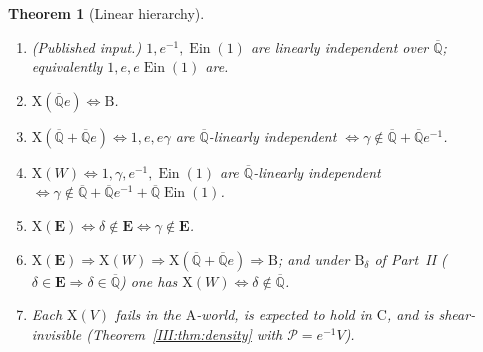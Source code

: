 \documentclass[11pt,a4paper]{article}
\newcommand{\Qbar}{\overline{\mathbb Q}}
\newcommand{\Ein}{\operatorname{Ein}}
\newcommand{\EE}{\mathbf E}
\newcommand{\Pc}{\mathcal P}
\newtheorem{theorem}{Theorem}[section]
\theoremstyle{definition}
\theoremstyle{remark}
\numberwithin{equation}{section}
\begin{document}
\begin{theorem}[Linear hierarchy]\label{III:thm:hierarchy}
\begin{enumerate}[label=(\roman*)]
\item \textup{(Published input.)} $1,e^{-1},\Ein(1)$ are linearly independent over
$\Qbar$; equivalently $1,e,e\Ein(1)$ are.
\item $\mathrm X(\Qbar e)\iff\mathrm B$.
\item $\mathrm X(\Qbar+\Qbar e)\iff 1,e,e\gamma$ are $\Qbar$-linearly independent
$\iff\gamma\notin\Qbar+\Qbar e^{-1}$.
\item $\mathrm X(W)\iff 1,\gamma,e^{-1},\Ein(1)$ are $\Qbar$-linearly independent
$\iff\gamma\notin\Qbar+\Qbar e^{-1}+\Qbar\Ein(1)$.
\item $\mathrm X(\EE)\iff\delta\notin\EE\iff\gamma\notin\EE$.
\item $\mathrm X(\EE)\Rightarrow\mathrm X(W)\Rightarrow\mathrm X(\Qbar+\Qbar e)
\Rightarrow\mathrm B$; and under $\mathrm B_\delta$ of Part~II
($\delta\in\EE\Rightarrow\delta\in\Qbar$) one has $\mathrm X(W)\iff\delta\notin\Qbar$.
\item Each $\mathrm X(V)$ fails in the $\mathrm A$-world, is expected to hold in
$\mathrm C$, and is shear-invisible (Theorem~\ref{III:thm:density} with $\Pc=e^{-1}V$).
\end{enumerate}
\end{theorem}
\end{document}
